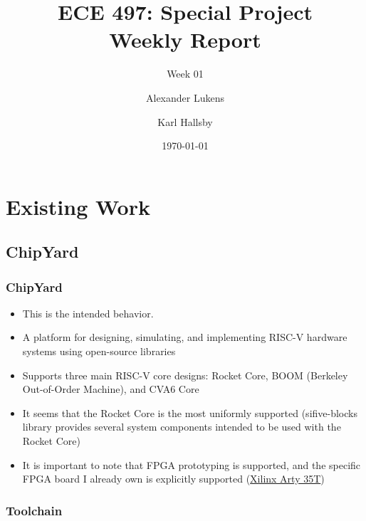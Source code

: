 \documentclass{weeklyslides}
\title[Weekly Report]{ECE 497: Special Project \\ Weekly Report}
\subtitle{Week 01}
\author{Alexander Lukens \and Karl Hallsby}
\institute{Illinois Institute of Technology}
\date{\today}
\begin{document}
\begin{frame}
  \titlepage{}
\end{frame}

\section{Existing Work}\label{sec:Existing Work}
\subsection{ChipYard}\label{subsec:ChipYard}
\begin{frame}
  \frametitle{ChipYard~\cite{chipyard}}
  \begin{itemize}
  \item This is the intended behavior.
  \item A platform for designing, simulating, and implementing RISC-V hardware systems using open-source libraries
  \item Supports three main RISC-V core designs: Rocket Core, BOOM (Berkeley Out-of-Order Machine), and CVA6 Core
  \item It seems that the Rocket Core is the most uniformly supported (sifive-blocks library provides several system components intended to be used with the Rocket Core)
  \item It is important to note that FPGA prototyping is supported, and the specific FPGA board I already own is explicitly supported (\href{https://www.xilinx.com/products/boards-and-kits/arty.html}{Xilinx Arty 35T})
  \end{itemize}

\end{frame}

\subsubsection{Toolchain}\label{subsubsec:Toolchain} %
\begin{frame}
  \frametitle{}
\end{frame}
\end{document}
